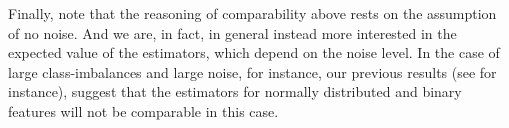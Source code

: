 Finally, note that the reasoning of comparability above rests on the assumption of no noise.
And we are, in fact, in general instead more interested in the expected value of the estimators, which depend on the noise level. In the case of large class-imbalances and large noise, for instance, our previous results (see  for instance), suggest that the estimators for normally distributed and binary features will not be comparable in this case.


